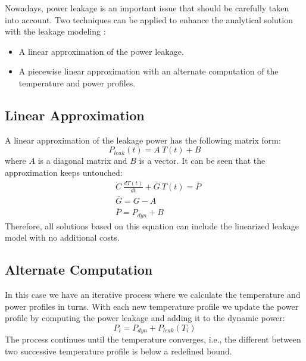   Nowadays, power leakage is an important issue that should be carefully taken into account. Two techniques can be applied to enhance the analytical solution with the leakage modeling \cite{liu2007}:
  \begin{itemize}
    \item A linear approximation of the power leakage.
    \item A piecewise linear approximation with an alternate computation of the temperature and power profiles.
  \end{itemize}

\subsection{Linear Approximation}
A linear approximation of the leakage power has the following matrix form:
\[
  P_{leak}(t) = A \: T(t) + B
\]
where $A$ is a diagonal matrix and $B$ is a vector. It can be seen that the approximation keeps  untouched:
\begin{align*}
  & C \: \frac{dT(t)}{dt} + \bar{G} \: T(t) = \bar{P} \\
  & \bar{G} = G - A \\
  & \bar{P} = P_{dyn} + B
\end{align*}
Therefore, all solutions based on this equation can include the linearized leakage model with no additional costs.

\subsection{Alternate Computation}
In this case we have an iterative process where we calculate the temperature and power profiles in turns. With each new temperature profile we update the power profile by computing the power leakage and adding it to the dynamic power:
\[
  P_i = P_{dyn} + P_{leak}(T_i)
\]
The process continues until the temperature converges, i.e., the different between two successive temperature profile is below a redefined bound.
